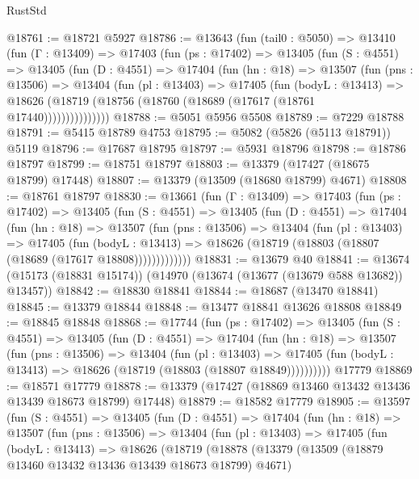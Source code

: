 \begin{lexlean}{RustStd}
\begin{coremodule}
@18761 := @18721 @5927
@18786 := @13643
    (fun (tail0 : @5050) =>
    @13410
      (fun (Γ : @13409) =>
      @17403
        (fun (ps : @17402) =>
        @13405
          (fun (S : @4551) =>
          @13405
            (fun (D : @4551) =>
            @17404
              (fun (hn : @18) =>
              @13507
                (fun (pns : @13506) =>
                @13404
                  (fun (pl : @13403) =>
                  @17405
                    (fun (bodyL : @13413) =>
                    @18626 (@18719 (@18756 (@18760 (@18689 (@17617 (@18761 @17440)))))))))))))))
@18788 := @5051 @5956 @5508
@18789 := @7229 @18788
@18791 := @5415 @18789 @4753
@18795 := @5082 (@5826 (@5113 @18791)) @5119
@18796 := @17687 @18795
@18797 := @5931 @18796
@18798 := @18786 @18797
@18799 := @18751 @18797
@18803 := @13379 (@17427 (@18675 @18799) @17448)
@18807 := @13379 (@13509 (@18680 @18799) @4671)
@18808 := @18761 @18797
@18830 := @13661
    (fun (Γ : @13409) =>
    @17403
      (fun (ps : @17402) =>
      @13405
        (fun (S : @4551) =>
        @13405
          (fun (D : @4551) =>
          @17404
            (fun (hn : @18) =>
            @13507
              (fun (pns : @13506) =>
              @13404
                (fun (pl : @13403) =>
                @17405
                  (fun (bodyL : @13413) =>
                  @18626 (@18719 (@18803 (@18807 (@18689 (@17617 @18808)))))))))))))
@18831 := @13679 @40
@18841 := @13674 (@15173 (@18831 @15174)) (@14970 (@13674 (@13677 (@13679 @588 @13682)) @13457))
@18842 := @18830 @18841
@18844 := @18687 (@13470 @18841)
@18845 := @13379 @18844
@18848 := @13477 @18841 @13626 @18808
@18849 := @18845 @18848
@18868 := @17744
    (fun (ps : @17402) =>
    @13405
      (fun (S : @4551) =>
      @13405
        (fun (D : @4551) =>
        @17404
          (fun (hn : @18) =>
          @13507
            (fun (pns : @13506) =>
            @13404
              (fun (pl : @13403) =>
              @17405 (fun (bodyL : @13413) => @18626 (@18719 (@18803 (@18807 @18849))))))))))
    @17779
@18869 := @18571 @17779
@18878 := @13379 (@17427 (@18869 @13460 @13432 @13436 @13439 @18673 @18799) @17448)
@18879 := @18582 @17779
@18905 := @13597
    (fun (S : @4551) =>
    @13405
      (fun (D : @4551) =>
      @17404
        (fun (hn : @18) =>
        @13507
          (fun (pns : @13506) =>
          @13404
            (fun (pl : @13403) =>
            @17405
              (fun (bodyL : @13413) =>
              @18626
                (@18719
                  (@18878
                    (@13379
                      (@13509 (@18879 @13460 @13432 @13436 @13439 @18673 @18799) @4671)

\end{coremodule}
\end{lexlean}
